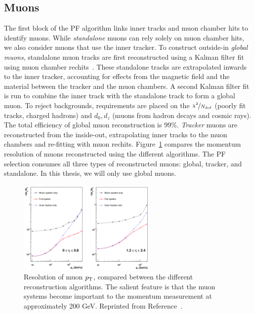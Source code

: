 \subsection{Muons}
\label{sec:cms:muons}

The first block of the PF algorithm links inner tracks and muon chamber hits to identify muons.
While \emph{standalone} muons can rely solely on muon chamber hits, we also consider muons that use the inner tracker.
To construct outside-in \emph{global muons}, standalone muon tracks are first reconstructed using a Kalman filter fit using muon chamber rechits~\cite{cmstdr1,cmsmuon}.
These standalone tracks are extrapolated inwards to the inner tracker, accounting for effects from the magnetic field and the  material between the tracker and the muon chambers.
A second Kalman filter fit is run to combine the inner track with the standalone track to form a global muon.
To reject backgrounds, requirements are placed on the $\nicefrac{\chi^2}{N_\mathrm{dof}}$ (poorly fit tracks, charged hadrons) and $d_0,d_z$ (muons from hadron decays and cosmic rays).
The total efficiency of global muon reconstruction is 99\%.
\emph{Tracker} muons are reconstructed from the inside-out, extrapolating inner tracks to the muon chambers and re-fitting with muon rechits.
Figure~\ref{fig:cms:muonpt} compares the momentum resolution of muons reconstructed using the different algorithms.  
The PF selection consumes all three types of reconstructed muons: global, tracker, and standalone.
In this thesis, we will only use global muons.

\begin{figure}[]
\begin{center}
    \includegraphics[width=0.6\textwidth]{figures/cms/muonpt.png}
    \caption{Resolution of muon $p_\mathrm{T}$, compared between the different reconstruction algorithms. 
             The salient feature is that the muon systems become important to the momentum measurement at approximately 200 GeV.
             Reprinted from Reference~\cite{cmsmuon}.}
    \label{fig:cms:muonpt}
\end{center}
\end{figure}

